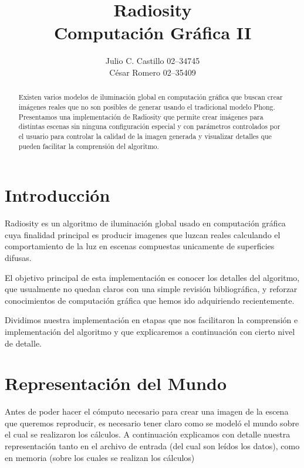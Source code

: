 \documentclass[letterpaper]{article}
\title{{\bf Radiosity} \\ \large Computación Gráfica II}
\author{Julio C. Castillo 02--34745 \\ César Romero 02--35409}
\begin{document}
\maketitle
\begin{abstract}
  Existen varios modelos de iluminación global en computación gráfica
  que buscan crear imágenes reales que no son posibles de generar
  usando el tradicional modelo Phong. Presentamos una implementación
  de Radiosity que permite crear imágenes para distintas escenas sin
  ninguna configuración especial y con parámetros controlados por el
  usuario para controlar la calidad de la imagen generada y visualizar
  detalles que pueden facilitar la comprensión del algoritmo.
\end{abstract}

\section{Introducción}
\label{sec:intro}
Radiosity es un algoritmo de iluminación global usado en computación
gráfica cuya finalidad principal es producir imagenes que luzcan
reales calculando el comportamiento de la luz en escenas compuestas
unicamente de superficies difusas.


El objetivo principal de esta implementación es conocer los detalles
del algoritmo, que usualmente no quedan claros con una simple revisión
bibliográfica, y reforzar conocimientos de computación gráfica que
hemos ido adquiriendo recientemente.

Dividimos nuestra implementación en etapas que nos facilitaron la
comprensión e implementación del algoritmo y que explicaremos a
continuación con cierto nivel de detalle.

\section{Representación del Mundo}
Antes de poder hacer el cómputo necesario para crear una imagen de la
escena que queremos reproducir, es necesario tener claro como se
modeló el mundo sobre el cual se realizaron los cálculos. A
continuación explicamos con detalle nuestra representación tanto en el
archivo de entrada (del cual son leídos los datos), como en memoria
(sobre los cuales se realizan los cálculos)
\end{document}
